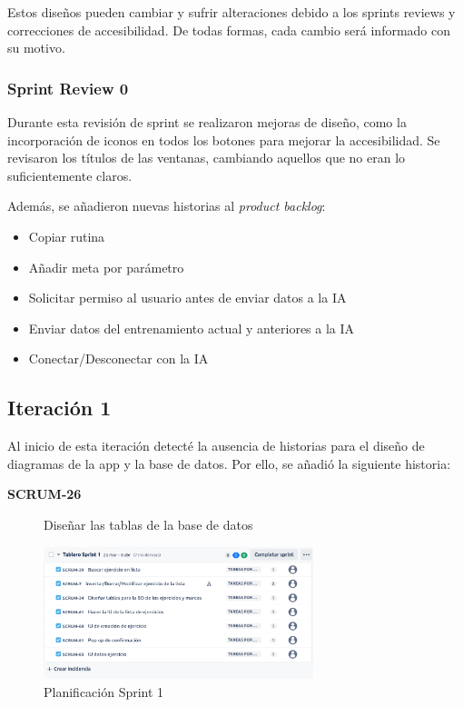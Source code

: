 Estos diseños pueden cambiar y sufrir alteraciones debido a los sprints reviews y correcciones de accesibilidad. De todas formas, cada cambio será informado con su motivo.

\subsubsection*{Sprint Review 0}
Durante esta revisi\'on de sprint se realizaron mejoras de dise\~no, como la incorporaci\'on de iconos en todos los botones para mejorar la accesibilidad. Se revisaron los t\'itulos de las ventanas, cambiando aquellos que no eran lo suficientemente claros.

Adem\'as, se a\~nadieron nuevas historias al \textit{product backlog}:

\begin{itemize}
  \item Copiar rutina
  \item A\~nadir meta por par\'ametro
  \item Solicitar permiso al usuario antes de enviar datos a la IA
  \item Enviar datos del entrenamiento actual y anteriores a la IA
  \item Conectar/Desconectar con la IA
\end{itemize}

\subsection*{Iteraci\'on 1}
Al inicio de esta iteraci\'on detect\'e la ausencia de historias para el dise\~no de diagramas de la app y la base de datos. Por ello, se a\~nadi\'o la siguiente historia:

\begin{description}
  \item[\textbf{SCRUM-26}] Dise\~nar las tablas de la base de datos
\end{description}

\begin{figure}[h!]
  \centering
  \includegraphics[width=0.7\textwidth]{fotos/PreSrprint1.png}
  \caption{Planificaci\'on Sprint 1}
  \label{fig:pre_sprint1}
\end{figure}


